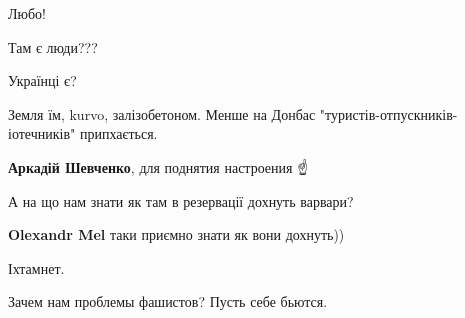 \begin{itemize}
Любо!

 
Там є люди???

 
Українці є?

 
Земля їм, kurvo, залізобетоном. Менше на Донбас "туристів-отпускників-іотечників" припхається.

 
\textbf{Аркадій Шевченко}, для поднятия настроения ☝️

 
А на що нам знати як там в резервації дохнуть варвари?

\begin{itemize}
 
\textbf{Olexandr Mel} таки приємно знати як вони дохнуть))
\end{itemize}

 
Іхтамнет.

 
Зачем нам проблемы фашистов? Пусть себе бьются.

\end{itemize}

